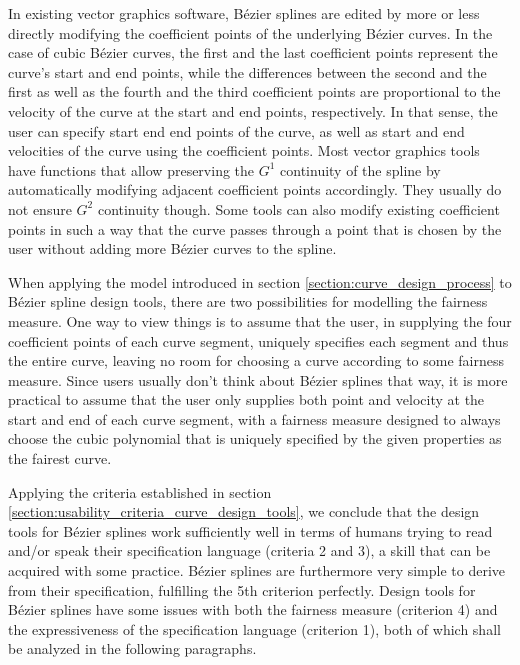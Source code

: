 \documentclass[a4paper]{article}
\begin{document}
				In existing vector graphics software, Bézier splines are edited by more or less directly modifying the coefficient points of the underlying Bézier curves. In the case of cubic Bézier curves, the first and the last coefficient points represent the curve's start and end points, while the differences between the second and the first as well as the fourth and the third coefficient points are proportional to the velocity of the curve at the start and end points, respectively. In that sense, the user can specify start end end points of the curve, as well as start and end velocities of the curve using the coefficient points. Most vector graphics tools have functions that allow preserving the \(G^1\) continuity of the spline by automatically modifying adjacent coefficient points accordingly. They usually do not ensure \(G^2\) continuity though. Some tools can also modify existing coefficient points in such a way that the curve passes through a point that is chosen by the user without adding more Bézier curves to the spline.

				When applying the model introduced in section \ref{section:curve_design_process} to Bézier spline design tools, there are two possibilities for modelling the fairness measure. One way to view things is to assume that the user, in supplying the four coefficient points of each curve segment, uniquely specifies each segment and thus the entire curve, leaving no room for choosing a curve according to some fairness measure. Since users usually don't think about Bézier splines that way, it is more practical to assume that the user only supplies both point and velocity at the start and end of each curve segment, with a fairness measure designed to always choose the cubic polynomial that is uniquely specified by the given properties as the fairest curve.

				Applying the criteria established in section \ref{section:usability_criteria_curve_design_tools}, we conclude that the design tools for Bézier splines work sufficiently well in terms of humans trying to read and/or speak their specification language (criteria 2 and 3), a skill that can be acquired with some practice. Bézier splines are furthermore very simple to derive from their specification, fulfilling the 5th criterion perfectly. Design tools for Bézier splines have some issues with both the fairness measure (criterion 4) and the expressiveness of the specification language (criterion 1), both of which shall be analyzed in the following paragraphs.
\end{document}
